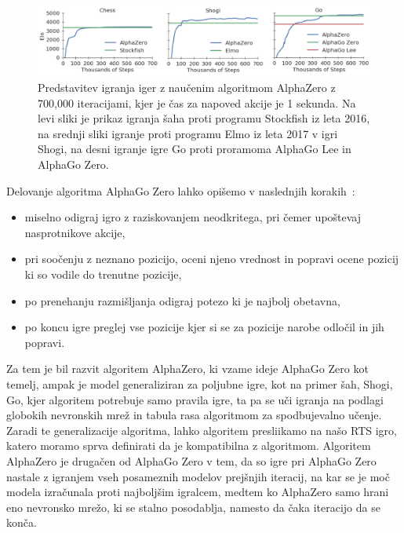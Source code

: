 \documentclass[a4paper, 12pt]{book}
\begin{document}
\begin{figure}[h]
	\begin{center}
		\includegraphics[width=1\textwidth]{photos/go.pdf}
	\end{center}
	\caption{Predstavitev igranja iger z naučenim algoritmom AlphaZero z 700,000 iteracijami, kjer je čas za napoved akcije je 1 sekunda. Na levi sliki je prikaz igranja šaha proti programu Stockfish iz leta 2016, na srednji sliki igranje proti programu Elmo iz leta 2017 v igri Shogi, na desni igranje igre Go proti proramoma AlphaGo Lee in AlphaGo Zero. }
	\label{picCompareGo}
\end{figure}

Delovanje algoritma AlphaGo Zero lahko opišemo v naslednjih korakih~\cite{guid}:
\begin{itemize}
	\item miselno odigraj igro z raziskovanjem neodkritega, pri čemer upoštevaj nasprotnikove akcije,
	\item pri soočenju z neznano pozicijo, oceni njeno vrednost in popravi ocene pozicij ki so vodile do trenutne pozicije,
	\item po prenehanju razmišljanja odigraj potezo ki je najbolj obetavna,
	\item po koncu igre preglej vse pozicije kjer si se za pozicije narobe odločil in jih popravi.
\end{itemize}


Za tem je bil razvit algoritem AlphaZero, ki vzame ideje AlphaGo Zero kot temelj, ampak je model generaliziran za poljubne igre, kot na primer šah, Shogi, Go, kjer algoritem potrebuje samo pravila igre, ta pa se uči igranja na podlagi globokih nevronskih mrež in tabula rasa algoritmom za spodbujevalno učenje.
Zaradi te generalizacije algoritma, lahko algoritem presliikamo na našo RTS igro, katero moramo sprva definirati da je kompatibilna z algoritmom.
Algoritem AlphaZero je drugačen od AlphaGo Zero v tem, da so igre pri AlphaGo Zero nastale z igranjem vseh posameznih modelov prejšnjih iteracij, na kar se je moč modela izračunala proti najboljšim igralcem, medtem ko AlphaZero samo hrani eno nevronsko mrežo, ki se stalno posodablja, namesto da čaka iteracijo da se konča.
\end{document}
